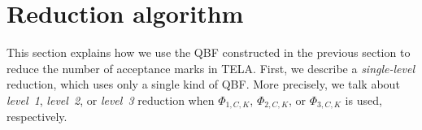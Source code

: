 \documentclass[a4paper,UKenglish,cleveref,autoref,thm-restate]{lipics-v2021}
\newcommand{\rem}{\mathit{nm}}
\def\false{\mathit{false}}
\def\true{\mathit{true}}
\newcommand{\mA}{\mathcal{A}}
\begin{document}

\section{Reduction algorithm}\label{sec:algo}

This section explains how we use the QBF constructed in the
previous section to reduce the number of acceptance marks in TELA.
First, we describe a \emph{single-level} reduction, which
uses only a single kind of QBF. More precisely, we talk about
\emph{level~1}, \emph{level~2}, or \emph{level~3} reduction when
$\Phi_{1,C,K}$, $\Phi_{2,C,K}$, or
$\Phi_{3,C,K}$ is used, respectively.

\end{document}
